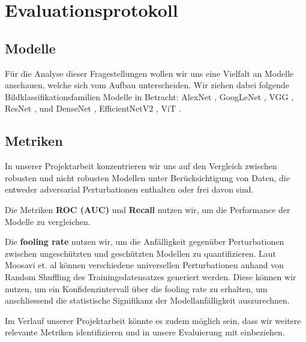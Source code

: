 \section{Evaluationsprotokoll}

\subsection{Modelle} 
Für die Analyse dieser Fragestellungen wollen wir uns eine Vielfalt an Modelle anschauen, welche sich vom Aufbau unterscheiden. Wir ziehen dabei folgende Bildklassifikationsfamilien Modelle in Betracht: AlexNet \cite{krizhevsky_imagenet_2012}, GoogLeNet \cite{szegedy_going_2014}, VGG \cite{simonyan_very_2015}, ResNet \cite{he_deep_2015}, und DenseNet \cite{huang_densely_2018}, EfficientNetV2 \cite{tan_efficientnetv2_2021}, ViT \cite{dosovitskiy_image_2021}.

\subsection{Metriken} 
In unserer Projektarbeit konzentrieren wir uns auf den Vergleich zwischen robusten und nicht robusten Modellen unter Berücksichtigung von Daten, die entweder adversarial Perturbationen enthalten oder frei davon sind.

Die Metriken \textbf{ROC (AUC)} und \textbf{Recall} nutzen wir, um die Performance der Modelle zu vergleichen.

Die \textbf{fooling rate} \cite{moosavi-dezfooli_universal_2017} nutzen wir, um die Anfälligkeit gegenüber Perturbationen zwischen ungeschützten und geschützten Modellen zu quantifizieren. Laut Moosavi et. al \cite{moosavi-dezfooli_universal_2017} können verschiedene universellen Perturbationen anhand von Random Shuffling des Trainingsdatensatzes generiert werden. Diese können wir nutzen, um ein Konfidenzintervall über die fooling rate zu erhalten, um anschliessend die statistische Signifikanz der Modellanfälligkeit auszurechnen. 

Im Verlauf unserer Projektarbeit könnte es zudem möglich sein, dass wir weitere relevante Metriken identifizieren und in unsere Evaluierung mit einbeziehen. 




